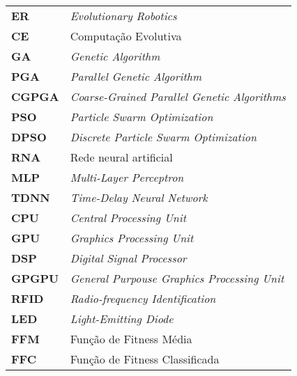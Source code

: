 \begin{tabular}[H]{l l}
    \textbf{ER} & \textit{Evolutionary Robotics} \\
    \textbf{CE} & Computação Evolutiva \\
    \textbf{GA} & \textit{Genetic Algorithm} \\
    \textbf{PGA} & \textit{Parallel Genetic Algorithm} \\
    \textbf{CGPGA} & \textit{Coarse-Grained Parallel Genetic Algorithms} \\
    \textbf{PSO} & \textit{Particle Swarm Optimization} \\
    \textbf{DPSO} & \textit{Discrete Particle Swarm Optimization} \\
    \textbf{RNA} & Rede neural artificial \\
    \textbf{MLP} & \textit{Multi-Layer Perceptron} \\
    \textbf{TDNN} & \textit{Time-Delay Neural Network} \\
    \textbf{CPU} & \textit{Central Processing Unit} \\
    \textbf{GPU} & \textit{Graphics Processing Unit} \\
    \textbf{DSP} & \textit{Digital Signal Processor} \\
    \textbf{GPGPU} & \textit{General Purpouse Graphics Processing Unit} \\
    \textbf{RFID} & \textit{Radio-frequency Identification} \\
    \textbf{LED} & \textit{Light-Emitting Diode} \\
    \textbf{FFM} & Função de Fitness Média \\
    \textbf{FFC} & Função de Fitness Classificada \\
\end{tabular}